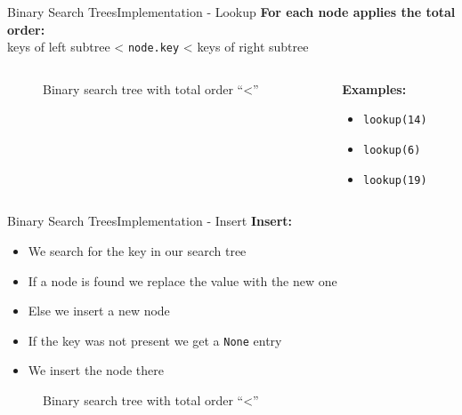 \begin{frame}{Binary Search Trees}{Implementation - Lookup}
  \textbf{For each node applies the total order:}\\
  \hspace{1.5em}keys of left subtree
  < \texttt{\color{Mittel-Blau}node.key} < keys of right
  subtree
  \begin{columns}
    \begin{column}{0.77\linewidth}
      \begin{figure}
        \begin{adjustbox}{width=\linewidth}
          
        \end{adjustbox}
        \caption{Binary search tree with total order
          \enquote{\color{Mittel-Blau}<}}
        \label{fig:binary_search_trees:binary_tree_lookup}
      \end{figure}
    \end{column}
    \begin{column}{0.23\linewidth}
      \textbf{Examples:}
      \begin{itemize}
        \item<4->
          \texttt{\color{red}lookup(14)}
        \item<5->
          \texttt{\color{Mittel-Gruen!50!blue}lookup(6)}
        \item<6->
          \texttt{\color{yellow!50!orange}lookup(19)}
      \end{itemize}
  \end{column}
\end{columns}
\end{frame}


\begin{frame}{Binary Search Trees}{Implementation - Insert}
  \textbf{Insert:}
  \begin{itemize}
    \item<2->
      We search for the key in our search tree
    \item<3->
      If a node is found we replace the value with the new one
    \item<4->
      Else we insert a new node
    \item<5->If the key was not present we get a \texttt{\color{Mittel-Blau}None} entry
    \item<6->We insert the node there
  \end{itemize}
  \vspace{-1em}
  \begin{figure}
    
    \caption{Binary search tree with total order
      \enquote{\color{Mittel-Blau}<}}
    \label{fig:binary_search_trees:binary_tree_insert}
  \end{figure}
\end{frame}


